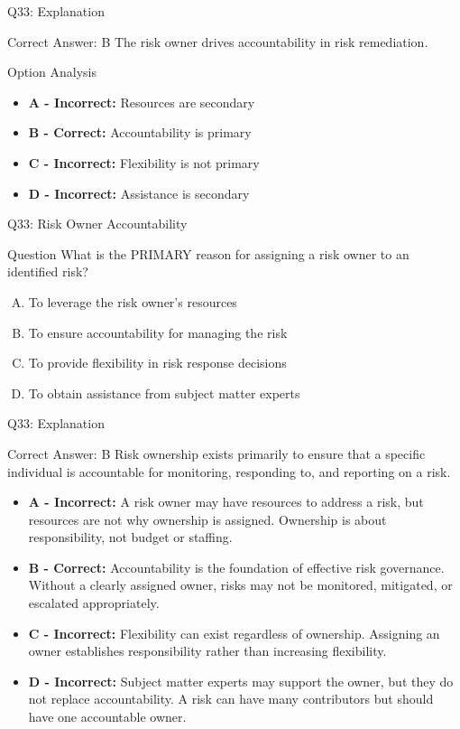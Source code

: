 \documentclass{beamer}
\begin{document}
	\begin{frame}{Q33: Explanation}
		\begin{block}{Correct Answer: B}
			The risk owner drives accountability in risk remediation.
		\end{block}
		\begin{block}{Option Analysis}
			\begin{itemize}
				\item \textbf{A - Incorrect:} Resources are secondary
				\item \textbf{B - Correct:} Accountability is primary
				\item \textbf{C - Incorrect:} Flexibility is not primary
				\item \textbf{D - Incorrect:} Assistance is secondary
			\end{itemize}
		\end{block}
	\end{frame}
	
	
	\begin{frame}{Q33: Risk Owner Accountability} \begin{block}{Question} What is the PRIMARY reason for assigning a risk owner to an identified risk? \end{block} \begin{enumerate}[(A)] \item To leverage the risk owner's resources \item To ensure accountability for managing the risk \item To provide flexibility in risk response decisions \item To obtain assistance from subject matter experts \end{enumerate} \end{frame} \begin{frame}{Q33: Explanation} \begin{block}{Correct Answer: B} Risk ownership exists primarily to ensure that a specific individual is accountable for monitoring, responding to, and reporting on a risk. \end{block} \begin{itemize} \item \textbf{A - Incorrect:} A risk owner may have resources to address a risk, but resources are not why ownership is assigned. Ownership is about responsibility, not budget or staffing. \item \textbf{B - Correct:} Accountability is the foundation of effective risk governance. Without a clearly assigned owner, risks may not be monitored, mitigated, or escalated appropriately. \item \textbf{C - Incorrect:} Flexibility can exist regardless of ownership. Assigning an owner establishes responsibility rather than increasing flexibility. \item \textbf{D - Incorrect:} Subject matter experts may support the owner, but they do not replace accountability. A risk can have many contributors but should have one accountable owner. \end{itemize} \end{frame}
	
\end{document}
